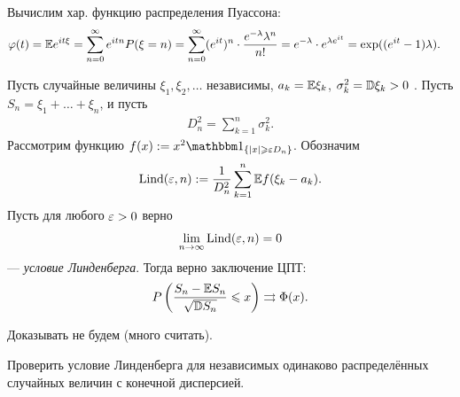 \documentclass[../main.tex]{subfiles}
\begin{document}
\begin{remrk*}
 Вычислим хар. функцию распределения Пуассона:
 \begin{align*}
  \varphi(t) &= \mathbb E e^{it\xi} = \sum_{n=0}^{\infty} e^{itn} P(\xi = n) = \sum_{n=0}^{\infty} (e^{it})^{n} \cdot \frac{e^{-\lambda} \lambda^{n}}{n!} = e^{-\lambda} \cdot e^{\lambda e^{it}} = \exp((e^{it} - 1)\lambda).
 \end{align*}
\end{remrk*}

\begin{thm}
 Пусть случайные величины $ \xi_1, \xi_2, \ldots $  независимы, $ a_k = \mathbb E \xi_k $,  $ \sigma_k^{2} = \mathbb D \xi_k > 0 $ . Пусть $ S_n = \xi_1 + \ldots + \xi_n $, и пусть
 \begin{align*}
  D_n^{2} = \sum_{k=1}^{n} \sigma_k^{2}.
 \end{align*} Рассмотрим функцию $ f(x) := x^{2} \Ind_{\left\{ \left| x \right| \geqslant \eps D_n \right\}} $. Обозначим
 \begin{align*}
  \mathrm{Lind}(\varepsilon, n) := \frac{1}{D_n^{2}} \sum_{k=1}^{n} \mathbb E f(\xi_k - a_k).
 \end{align*} Пусть для любого $ \varepsilon > 0 $ верно
  \begin{align*}
  \lim_{n \to \infty} \mathrm{Lind}(\varepsilon, n) = 0
 \end{align*} --- \textit{условие Линденберга}. Тогда верно заключение ЦПТ:
 \begin{align*}
  P \left( \frac{S_n - \mathbb E S_n}{\sqrt{\mathbb D S_n}} \leqslant x \right) \rightrightarrows \Phi(x).
 \end{align*}
\end{thm}

Доказывать не будем (много считать).

\begin{exercs*}
 Проверить условие Линденберга для независимых одинаково распределённых случайных величин с конечной дисперсией.
\end{exercs*}
\end{document}
